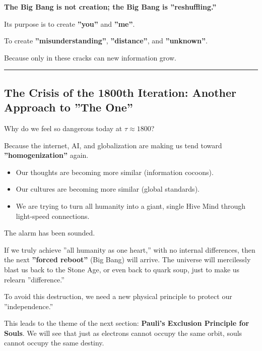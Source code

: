 \textbf{The Big Bang is not creation; the Big Bang is ''reshuffling.''}

Its purpose is to create \textbf{''you''} and \textbf{''me''}.

To create \textbf{''misunderstanding''}, \textbf{''distance''}, and \textbf{''unknown''}.

Because only in these cracks can new information grow.

\hrule

\subsection{The Crisis of the 1800th Iteration: Another Approach to ''The One''}

Why do we feel so dangerous today at $\tau \approx 1800$?

Because the internet, AI, and globalization are making us tend toward \textbf{''homogenization''} again.

\begin{itemize}
\item Our thoughts are becoming more similar (information cocoons).

\item Our cultures are becoming more similar (global standards).

\item We are trying to turn all humanity into a giant, single Hive Mind through light-speed connections.
\end{itemize}

The alarm has been sounded.

If we truly achieve ''all humanity as one heart,'' with no internal differences, then the next \textbf{''forced reboot''} (Big Bang) will arrive. The universe will mercilessly blast us back to the Stone Age, or even back to quark soup, just to make us relearn ''difference.''

To avoid this destruction, we need a new physical principle to protect our ''independence.''

This leads to the theme of the next section: \textbf{Pauli's Exclusion Principle for Souls}. We will see that just as electrons cannot occupy the same orbit, souls cannot occupy the same destiny.

